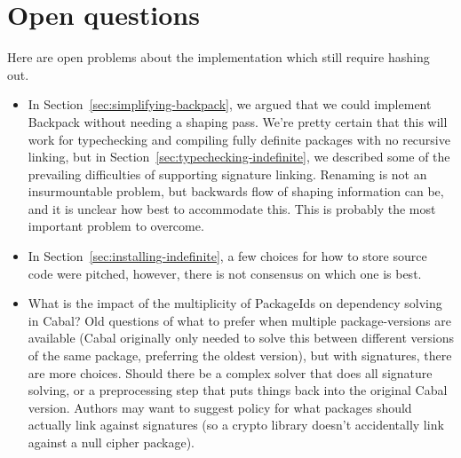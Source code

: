 \documentclass{article}
\begin{document}
\section{Open questions}\label{sec:open-questions}

Here are open problems about the implementation which still require
hashing out.

\begin{itemize}

    \item In Section~\ref{sec:simplifying-backpack}, we argued that we
        could implement Backpack without needing a shaping pass. We're
        pretty certain that this will work for typechecking and
        compiling fully definite packages with no recursive linking, but
        in Section~\ref{sec:typechecking-indefinite}, we described some
        of the prevailing difficulties of supporting signature linking.
        Renaming is not an insurmountable problem, but backwards flow of
        shaping information can be, and it is unclear how best to
        accommodate this.  This is probably the most important problem
        to overcome.

    \item In Section~\ref{sec:installing-indefinite}, a few choices for how to
        store source code were pitched, however, there is not consensus on which
        one is best.

    \item What is the impact of the multiplicity of PackageIds on
        dependency solving in Cabal?  Old questions of what to prefer
        when multiple package-versions are available (Cabal originally
        only needed to solve this between different versions of the same
        package, preferring the oldest version), but with signatures,
        there are more choices.  Should there be a complex solver that
        does all signature solving, or a preprocessing step that puts
        things back into the original Cabal version.  Authors may want
        to suggest policy for what packages should actually link against
        signatures (so a crypto library doesn't accidentally link
        against a null cipher package).

\end{itemize}



\end{document}
